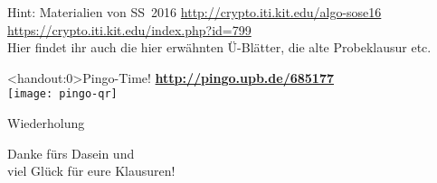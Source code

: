 





	
		
\begin{frame}{Hint: Materialien von SS~2016}
	\centering 
	\Large
	\url{http://crypto.iti.kit.edu/algo-sose16} \\
	\bigskip
	\url{https://crypto.iti.kit.edu/index.php?id=799} \\
	\bigskip
	\normalsize Hier findet ihr auch die hier erwähnten Ü-Blätter, die alte Probeklausur etc.
\end{frame}
	
\begin{frame}<handout:0>{Pingo-Time! \smiley}
	\centering
	\textbf{\large \url{http://pingo.upb.de/685177}} \\
	\texttt{[image: pingo-qr]}
\end{frame}
	
\begin{headframe}
	Wiederholung
\end{headframe}





	
\begin{headframe}
	Danke fürs Dasein und \\
	viel Glück für eure Klausuren! \smiley 
\end{headframe}
	

